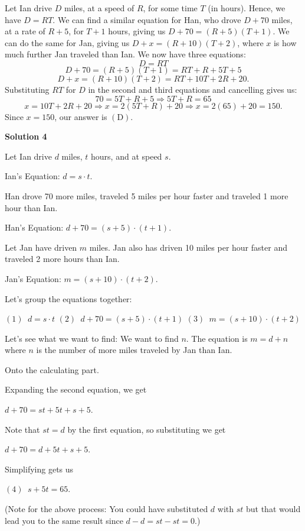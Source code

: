 \begin{enumerate}
Let Ian drive $D$ miles, at a speed of $R$, for some time $T$ (in hours). Hence, we have $D=RT$. We can find a similar equation for Han, who drove $D + 70$ miles, at a rate of $R+5$, for $T+1$ hours, giving us $D + 70 = (R + 5)(T + 1)$. We can do the same for Jan, giving us $D + x = (R + 10)(T + 2)$, where $x$ is how much further Jan traveled than Ian. We now have three equations:
 \[D= RT\]
 \[D + 70 = (R+5)(T+1) = RT + R + 5T + 5\]
 \[D + x = (R + 10)(T + 2) = RT + 10 T + 2R + 20.\]Substituting $RT$ for $D$ in the second and third equations and cancelling gives us:
 \[70 = 5T + R + 5 \Longrightarrow 5T + R = 65\]
 \[x = 10T + 2R + 20  \Longrightarrow x = 2(5T + R ) + 20  \Longrightarrow x= 2(65) + 20 = 150.\]Since $x = 150$, our answer is $\boxed{\mathrm{(D)}}$.

 



\textbf{Solution 4}

Let Ian drive $d$ miles, $t$ hours, and at speed $s$.

 Ian's Equation: $d=s \cdot t.$

 Han drove 70 more miles, traveled 5 miles per hour faster and traveled 1 more hour than Ian.

 Han's Equation: $d+70=(s+5) \cdot (t+1).$

 Let Jan have driven $m$ miles. Jan also has driven 10 miles per hour faster and traveled 2 more hours than Ian.

 Jan's Equation: $m=(s+10) \cdot (t+2).$

 Let's group the equations together:

 $(1) \phantom{a} d=s \cdot t$
$(2) \phantom{a} d+70=(s+5) \cdot (t+1)$
$(3) \phantom{a} m=(s+10) \cdot (t+2)$

 Let's see what we want to find: We want to find $n$. The equation is $m=d+n$ where $n$ is the number of more miles traveled by Jan than Ian.

 Onto the calculating part.

 Expanding the second equation, we get

 $d+70=st+5t+s+5.$

 Note that $st=d$ by the first equation, so substituting we get

 $d+70=d+5t+s+5.$

 Simplifying gets us 

 $(4) \phantom{a} s+5t=65.$

 (Note for the above process: You could have substituted $d$ with $st$ but that would lead you to the same result since $d-d=st-st=0.$)


\end{enumerate}

